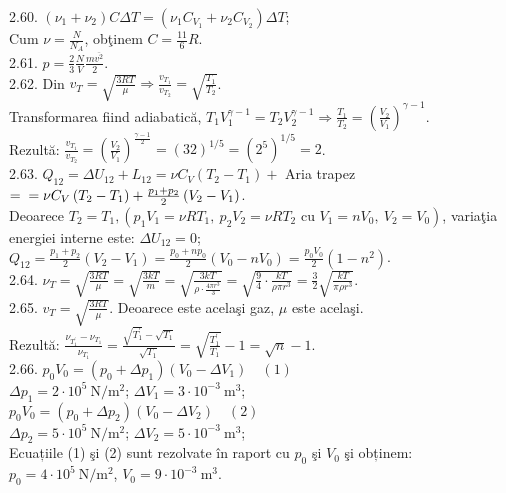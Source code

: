 2.60. $\left(\nu_{1}+\nu_{2}\right) C \Delta T=\left(\nu_{1} C_{V_{1}}+\nu_{2} C_{V_{2}}\right) \Delta T$;\\ Cum $\nu=\frac{N}{N_{A}}$, obţinem $C=\frac{11}{6} R$.\\

2.61. $p=\frac{2}{3} \frac{N}{V} \frac{m \overline{v^{2}}}{2}$.\\

2.62. Din $v_{T}=\sqrt{\frac{3 R T}{\mu}} \Rightarrow \frac{v_{T_{1}}}{v_{T_{2}}}=\sqrt{\frac{T_{1}}{T_{2}}}$.\\ Transformarea fiind adiabatică, $T_{1} V_{1}^{\gamma-1}=T_{2} V_{2}^{\gamma-1} \Rightarrow \frac{T_{1}}{T_{2}}=\left(\frac{V_{2}}{V_{1}}\right)^{\gamma-1}$.\\ Rezultă: $\frac{v_{T_{1}}}{v_{T_{2}}}=\left(\frac{V_{2}}{V_{1}}\right)^{\frac{\gamma-1}{2}}=(32)^{1 / 5}=\left(2^{5}\right)^{1 / 5}=2$.\\

2.63. $Q_{12}=\Delta U_{12}+L_{12}=\nu C_{V}\left(T_{2}-T_{1}\right)+$ Aria trapez $= \\ =\nu C_{V}\left(T_{2}-T_{1}\right)+\frac{p_{1}+p_{2}}{2}\left(V_{2}-V_{1}\right)$.\\ Deoarece $T_{2}=T_{1},\left(p_{1} V_{1}=\nu R T_{1},\ p_{2} V_{2}=\nu R T_{2} \text { cu } V_{1}=n V_{0},\ V_{2}=V_{0}\right)$, variaţia energiei interne este: $\Delta U_{12}=0$;\\ $Q_{12}=\frac{p_{1}+p_{2}}{2}\left(V_{2}-V_{1}\right)=\frac{p_{0}+n p_{0}}{2}\left(V_{0}-n V_{0}\right)=\frac{p_{0} V_{0}}{2}\left(1-n^{2}\right)$.\\

2.64. $\nu_{T}=\sqrt{\frac{3 R T}{\mu}}=\sqrt{\frac{3 k T}{m}}=\sqrt{\frac{3 k T}{\rho \cdot \frac{4 \pi r^{3}}{3}}}=\sqrt{\frac{9}{4} \cdot \frac{k T}{\rho \pi r^{3}}}=\frac{3}{2} \sqrt{\frac{k T}{\pi \rho r^{3}}}$.\\

2.65. $v_{T}=\sqrt{\frac{3 R T}{\mu}}$. Deoarece este acelaşi gaz, $\mu$ este acelaşi.\\ Rezultă: $\frac{\nu_{T_{1}^{\prime}}-\nu_{T_{1}}}{\nu_{T_{1}}}=\frac{\sqrt{T_{1}^{\prime}}-\sqrt{T_{1}}}{\sqrt{T_{1}}}=\sqrt{\frac{T_{1}^{\prime}}{T_{1}}}-1=\sqrt{n}-1$.\\

2.66. $p_{0} V_{0}=\left(p_{0}+\Delta p_{1}\right)\left(V_{0}-\Delta V_{1}\right) \quad (1)$\\ $\Delta p_{1}=2 \cdot 10^{5} \mathrm{~N} / \mathrm{m}^{2}$; $\Delta V_{1}=3 \cdot 10^{-3} \mathrm{~m}^{3}$;\\ $p_{0} V_{0}=\left(p_{0}+\Delta p_{2}\right)\left(V_{0}-\Delta V_{2}\right) \quad (2)$\\ $\Delta p_{2}=5 \cdot 10^{5} \mathrm{~N} / \mathrm{m}^{2}$; $\Delta V_{2}=5 \cdot 10^{-3} \mathrm{~m}^{3}$;\\ Ecuațiile (1) şi (2) sunt rezolvate în raport cu $p_{0}$ şi $V_{0}$ şi obținem:\\ $p_{0}=4 \cdot 10^{5} \mathrm{~N} / \mathrm{m}^{2}$, $V_{0}=9 \cdot 10^{-3} \mathrm{~m}^{3}$.\\

